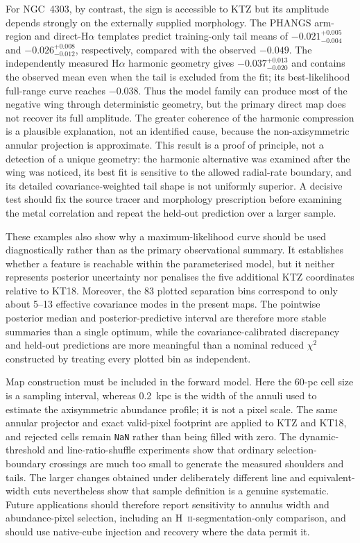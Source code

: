 \documentclass[fleqn,usenatbib]{mnras}
\begin{document}
For NGC~4303, by contrast, the sign is accessible to KTZ but its amplitude depends strongly on the externally supplied morphology.  The PHANGS arm-region and direct-H$\alpha$ templates predict training-only tail means of $-0.021^{+0.005}_{-0.004}$ and $-0.026^{+0.008}_{-0.012}$, respectively, compared with the observed $-0.049$.  The independently measured H$\alpha$ harmonic geometry gives $-0.037^{+0.013}_{-0.020}$ and contains the observed mean even when the tail is excluded from the fit; its best-likelihood full-range curve reaches $-0.038$.  Thus the model family can produce most of the negative wing through deterministic geometry, but the primary direct map does not recover its full amplitude.  The greater coherence of the harmonic compression is a plausible explanation, not an identified cause, because the non-axisymmetric annular projection is approximate.  This result is a proof of principle, not a detection of a unique geometry: the harmonic alternative was examined after the wing was noticed, its best fit is sensitive to the allowed radial-rate boundary, and its detailed covariance-weighted tail shape is not uniformly superior.  A decisive test should fix the source tracer and morphology prescription before examining the metal correlation and repeat the held-out prediction over a larger sample.

These examples also show why a maximum-likelihood curve should be used diagnostically rather than as the primary observational summary.  It establishes whether a feature is reachable within the parameterised model, but it neither represents posterior uncertainty nor penalises the five additional KTZ coordinates relative to KT18.  Moreover, the 83 plotted separation bins correspond to only about 5--13 effective covariance modes in the present maps.  The pointwise posterior median and posterior-predictive interval are therefore more stable summaries than a single optimum, while the covariance-calibrated discrepancy and held-out predictions are more meaningful than a nominal reduced $\chi^2$ constructed by treating every plotted bin as independent.

Map construction must be included in the forward model.  Here the 60-pc cell size is a sampling interval, whereas 0.2~kpc is the width of the annuli used to estimate the axisymmetric abundance profile; it is not a pixel scale.  The same annular projector and exact valid-pixel footprint are applied to KTZ and KT18, and rejected cells remain \texttt{NaN} rather than being filled with zero.  The dynamic-threshold and line-ratio-shuffle experiments show that ordinary selection-boundary crossings are much too small to generate the measured shoulders and tails.  The larger changes obtained under deliberately different line and equivalent-width cuts nevertheless show that sample definition is a genuine systematic.  Future applications should therefore report sensitivity to annulus width and abundance-pixel selection, including an H~\textsc{ii}-segmentation-only comparison, and should use native-cube injection and recovery where the data permit it.
\end{document}
